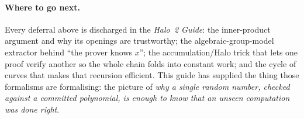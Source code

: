 \documentclass[11pt,a4paper]{article}
\theoremstyle{definition}
\begin{document}
\paragraph{Where to go next.} Every deferral above is discharged in the
\emph{Halo~2 Guide}: the inner-product argument and why its openings are
trustworthy; the algebraic-group-model extractor behind ``the prover knows
$x$''; the accumulation/Halo trick that lets one proof verify another so the
whole chain folds into constant work; and the cycle of curves that makes that
recursion efficient. This guide has supplied the thing those formalisms are
formalising: the picture of \emph{why a single random number, checked against a
committed polynomial, is enough to know that an unseen computation was done
right}.
\end{document}
